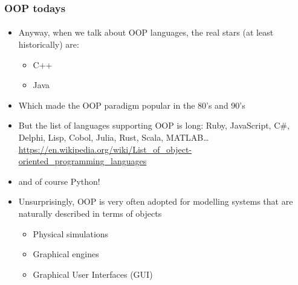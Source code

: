 \documentclass[9pt]{beamer}
\begin{document}
\begin{frame}
  \frametitle{OOP todays}
  \framesubtitle{}
  \begin{itemize}
    \item Anyway, when we talk about OOP languages, the real stars (at least historically) are:
    \smallskip
    \begin{itemize}
      \item C++
      \smallskip
      \item Java
    \end{itemize}
    \smallskip
    \item Which made the OOP paradigm popular in the 80's and 90's
    
    \medskip
    \item But the list of languages supporting OOP is long: Ruby, JavaScript, C\#, Delphi, Lisp, Cobol, Julia, Rust, Scala, MATLAB\dots \\
    \tiny
    \url{https://en.wikipedia.org/wiki/List_of_object-oriented_programming_languages}
    \normalsize
    \smallskip
    \item and of course Python!
    \bigskip
    \item Unsurprisingly, OOP is very often adopted for modelling systems that are naturally
          described in terms of objects  
    \begin{itemize}
      \item Physical simulations
      \smallskip
      \item Graphical engines
      \smallskip
      \item Graphical User Interfaces (GUI) 
    \end{itemize}
  \end{itemize}
  
\end{frame}
\end{document}
